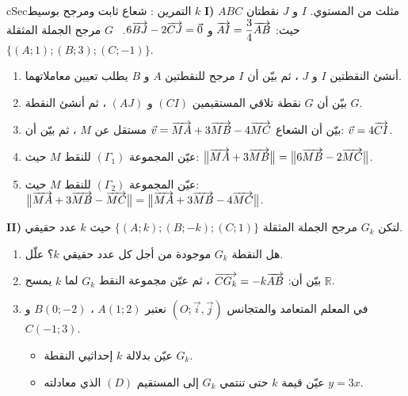 \documentclass[12pt,a4paper]{article}
\newenvironment{BOX}[2]{\begin{otherlanguage}{english}\begin{arbox}{#1}{#2}}{\end{arbox}\end{otherlanguage}}
\newcounter{exo}
\newenvironment{tamrin}[1]{\stepcounter{exo}\begin{BOX}{cSec}{التمرين \theexo: #1}}{\end{BOX}}
\newcommand{\R}{\mathbb{R}}
\newenvironment{sq}{\begin{itemize}[leftmargin=2.4em,itemsep=3pt]}{\end{itemize}}
\newcommand{\qa}{\item[(أ)]}\newcommand{\qb}{\item[(ب)]}\newcommand{\qc}{\item[(جـ)]}\newcommand{\qd}{\item[(د)]}\newcommand{\qe}{\item[(هـ)]}
\begin{document}
\begin{tamrin}{شعاع ثابت ومرجح بوسيط $k$}
\textbf{I)} $ABC$ مثلث من المستوي. $I$ و $J$ نقطتان حيث: $\overrightarrow{AI}=\dfrac34\overrightarrow{AB}$ و $6\overrightarrow{BJ}-2\overrightarrow{CJ}=\vec0$. \ $G$ مرجح الجملة المثقلة $\{(A;1);(B;3);(C;-1)\}$.
\begin{enumerate}
\item أنشئ النقطتين $I$ و $J$ ، ثم بيّن أن $I$ مرجح للنقطتين $A$ و $B$ يطلب تعيين معاملاتهما.
\item بيّن أن $G$ نقطة تلاقي المستقيمين $(CI)$ و $(AJ)$ ، ثم أنشئ النقطة $G$.
\item بيّن أن الشعاع $\vec v=\overrightarrow{MA}+3\overrightarrow{MB}-4\overrightarrow{MC}$ مستقل عن $M$ ، ثم بيّن أن: $\vec v=4\overrightarrow{CI}$.
\item عيّن المجموعة $(\Gamma_1)$ للنقط $M$ حيث: $\big\|\overrightarrow{MA}+3\overrightarrow{MB}\big\|=\big\|6\overrightarrow{MB}-2\overrightarrow{MC}\big\|$.
\item عيّن المجموعة $(\Gamma_2)$ للنقط $M$ حيث: $\big\|\overrightarrow{MA}+3\overrightarrow{MB}-\overrightarrow{MC}\big\|=\big\|\overrightarrow{MA}+3\overrightarrow{MB}-4\overrightarrow{MC}\big\|$.
\end{enumerate}
\textbf{II)} لتكن $G_k$ مرجح الجملة المثقلة $\{(A;k);(B;-k);(C;1)\}$ حيث $k$ عدد حقيقي.
\begin{enumerate}[resume]
\item هل النقطة $G_k$ موجودة من أجل كل عدد حقيقي $k$؟ علّل.
\item بيّن أن: $\overrightarrow{CG_k}=-k\overrightarrow{AB}$ ، ثم عيّن مجموعة النقط $G_k$ لما $k$ يمسح $\R$.
\item في المعلم المتعامد والمتجانس $(O;\vec i,\vec j)$ نعتبر $A(1;2)$ ، $B(0;-2)$ و $C(-1;3)$.
\begin{sq}
\qa عيّن بدلالة $k$ إحداثيي النقطة $G_k$.
\qb عيّن قيمة $k$ حتى تنتمي $G_k$ إلى المستقيم $(D)$ الذي معادلته $y=3x$.
\end{sq}
\end{enumerate}
\end{tamrin}
\end{document}
